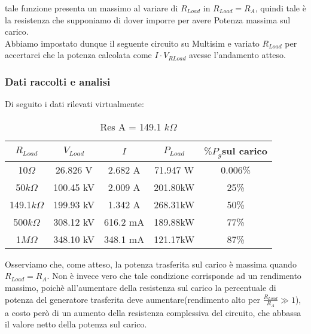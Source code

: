 \documentclass[a4paper]{article}
\theoremstyle{definition}
\begin{document}
\noindent tale funzione presenta un massimo al variare di \(R_{Load}\) in \(R_{Load} = R_{A}\), quindi tale è la resistenza che supponiamo di dover imporre per avere Potenza massima sul carico.\\

\noindent Abbiamo impostato dunque il seguente circuito su Multisim e variato \(R_{Load}\) per accertarci che la potenza calcolata come \(I \cdot V_{RLoad}\) avesse l'andamento atteso.\\


\begin{figure}[!ht]

    \caption{}
  \label{fig:partitore2approfondimento}
\end{figure}

\subsubsection*{Dati raccolti e analisi}

Di seguito i dati rilevati virtualmente:

\begin{table}[!htbp]
\centering
    \captionsetup{labelformat=empty}
        \caption{Res A = 149.1 $k\Omega$}
    \begin{tabular}{c|c|c|c|c}
        \(R_{Load}\) & \(V_{Load}\) & \(I\) & \(P_{Load}\) & \(\%P_{g} \)sul carico \\
        \hline
        \hline
        10$\Omega$ &   26.826 V &  2.682 A & 71.947 W & 0.006\%\\
        50$k\Omega$ &  100.45 kV & 2.009 A & 201.80kW & 25\%\\
        149.1$k\Omega$ & 199.93 kV & 1.342 A & 268.31kW & 50\%\\
        500$k\Omega$ & 308.12 kV & 616.2 mA &  189.88kW & 77\%\\
        1$M\Omega$ &   348.10 kV & 348.1 mA & 121.17kW & 87\%\\
        \hline
        \hline
    \end{tabular}

\end{table}

\noindent Osserviamo che, come atteso, la potenza trasferita sul carico è massima quando \(R_{Load} = R_{A}\). Non è invece vero che tale condizione corrisponde ad un rendimento massimo, poichè all'aumentare della resistenza sul carico la percentuale di potenza del generatore trasferita deve aumentare(rendimento alto per \(\frac{R_{Load}}{R_{A}} \gg 1\)), a costo però di un aumento della resistenza complessiva del circuito, che abbassa il valore netto della potenza sul carico.\\\\
\end{document}
